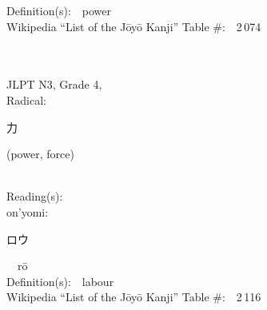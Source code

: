 \begin{multicols}{2}
Definition(s):\ \ power \\
Wikipedia ``List of the J\=oy\=o Kanji'' Table \#:\ \ 2\,074 \\
\ \ \\
{\fontsize{34pt}{40pt}  }\ \ \\  %
{JLPT N3, Grade 4, \\Radical:\ \ {\begin{CJK}{UTF8}{min} 力 \end{CJK}} (power, force) } \\
Reading(s):\ \ \\
{\hspace*{1em}}on'yomi:\ \ \\
{\hspace*{2em}}{\begin{CJK}{UTF8}{min} ロウ \end{CJK}}\ \ r\=o\ \ \\
Definition(s):\ \ labour \\
Wikipedia ``List of the J\=oy\=o Kanji'' Table \#:\ \ 2\,116 \\
\ \ \\
\end{multicols}



